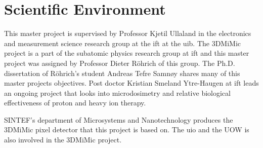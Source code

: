 \documentclass[../main/thesis.tex]{subfiles}
\begin{document}
\section{Scientific Environment}
\label{i-environment}
This master project is supervised by Professor Kjetil Ullaland in the electronics and measurement science research group at the \gls{ift} at the \gls{uib}. The 3DMiMic project is a part of the subatomic physics research group at \gls{ift} and this master project was assigned by Professor Dieter Röhrich of this group. The Ph.D. dissertation of Röhrich's student Andreas Tefre Samnøy shares many of this master projects objectives. Post doctor Kristian Smeland Ytre-Haugen at \gls{ift} leads an ongoing project that looks into microdosimetry and relative biological effectiveness of proton and heavy ion therapy. 

SINTEF's department of Microsystems and Nanotechnology produces the 3DMiMic pixel detector that this project is based on. The \gls{uio} and the \gls{UOW} is also involved in the 3DMiMic project. 

\end{document}
